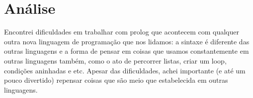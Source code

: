 \chapter{Análise}
\label{sec-analise}

Encontrei dificuldades em trabalhar com prolog que acontecem com qualquer outra nova linguagem de programação que nos lidamos: a sintaxe é diferente das outras linguagens e a forma de pensar em coisas que usamos constantemente em outras linguagens também, como o ato de percorrer listas, criar um loop, condições aninhadas e etc. Apesar das dificuldades, achei importante (e até um pouco divertido) repensar coisas que são meio que estabelecida em outras linguagens.
